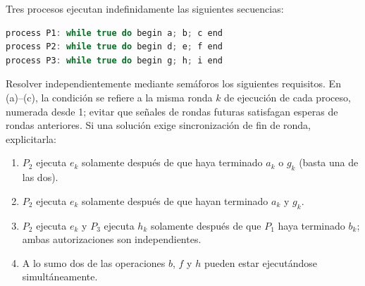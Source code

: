 \begin{ejercicio}
Tres procesos ejecutan indefinidamente las siguientes secuencias:
\begin{lstlisting}[language=C++]
process P1: while true do begin a; b; c end
process P2: while true do begin d; e; f end
process P3: while true do begin g; h; i end
\end{lstlisting}
Resolver independientemente mediante semáforos los siguientes requisitos. En (a)--(c), la condición se refiere a la misma ronda $k$ de ejecución de cada proceso, numerada desde 1; evitar que señales de rondas futuras satisfagan esperas de rondas anteriores. Si una solución exige sincronización de fin de ronda, explicitarla:
\begin{enumerate}[label=(\alph*)]
    \item $P_2$ ejecuta $e_k$ solamente después de que haya terminado $a_k$ o $g_k$ (basta una de las dos).
    \item $P_2$ ejecuta $e_k$ solamente después de que hayan terminado $a_k$ y $g_k$.
    \item $P_2$ ejecuta $e_k$ y $P_3$ ejecuta $h_k$ solamente después de que $P_1$ haya terminado $b_k$; ambas autorizaciones son independientes.
    \item A lo sumo dos de las operaciones $b$, $f$ y $h$ pueden estar ejecutándose simultáneamente.
\end{enumerate}
\end{ejercicio}

